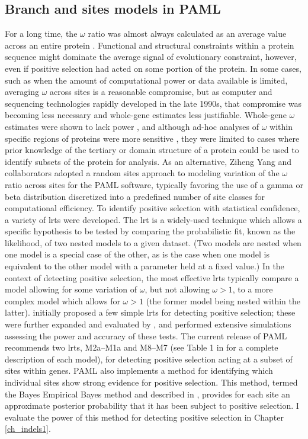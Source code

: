 \subsection{Branch and sites models in PAML}

For a long time, the $\omega$ ratio was almost always calculated as an
average value across an entire protein \citep{Sharp1997}. Functional
and structural constraints within a protein sequence might dominate
the average signal of evolutionary constraint, however, even if
positive selection had acted on some portion of the protein. In some
cases, such as when the amount of computational power or data
available is limited, averaging $\omega$ across sites is a reasonable
compromise, but as computer and sequencing technologies rapidly
developed in the late 1990s, that compromise was becoming less
necessary and whole-gene estimates less justifiable. Whole-gene
$\omega$ estimates were shown to lack power \citep{Endo1996}, and
although ad-hoc analyses of $\omega$ within specific regions of proteins
were more sensitive \citep{Hughes1988}, they were limited to cases
where prior knowledge of the tertiary or domain structure of a protein
could be used to identify subsets of the protein for analysis. As an
alternative, Ziheng Yang and collaborators adopted a random sites
approach to modeling variation of the $\omega$ ratio across sites for
the PAML software, typically favoring the use of a gamma or beta
distribution discretized into a predefined number of site classes for
computational efficiency. To identify positive selection with
statistical confidence, a variety of \acp{lrt} were developed. The
\ac{lrt} is a widely-used technique which allows a specific hypothesis
to be tested by comparing the probabilistic fit, known as the
likelihood, of two nested models to a given dataset. (Two models are
nested when one model is a special case of the other, as is the case
when one model is equivalent to the other model with a parameter held
at a fixed value.) In the context of detecting positive selection, the
most effective \acp{lrt} typically compare a model allowing for some
variation of $\omega$, but not allowing $\omega>1$, to a more complex
model which allows for $\omega>1$ (the former model being nested
within the latter). \citet{Nielsen1998} initially proposed a few
simple \acp{lrt} for detecting positive selection; these were further
expanded and evaluated by \citet{Yang2000CodonSubstitution}, and
\citet{Anisimova2001} performed extensive simulations assessing the
power and accuracy of these tests. The current release of PAML
recommends two \acp{lrt}, M2a--M1a and M8--M7 (see Table 1 in
\citet{Wong2004} for a complete description of each model), for
detecting positive selection acting at a subset of sites within
genes. PAML also implements a method for identifying which individual
sites show strong evidence for positive selection. This method, termed
the Bayes Empirical Bayes method and described in
\citet{Yang2005Bayes}, provides for each site an approximate posterior
probability that it has been subject to positive selection. I evaluate
the power of this method for detecting \sw positive selection in
Chapter \ref{ch_indels1}.

